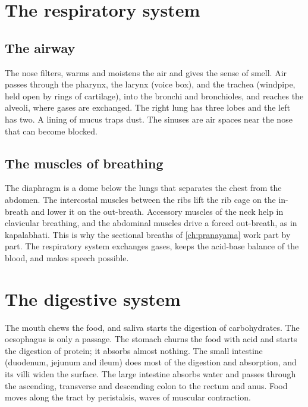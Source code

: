 
\section{The respiratory system}

\subsection*{The airway}
The nose filters, warms and moistens the air and gives the sense of smell. Air passes through the pharynx, the larynx (voice box), and the trachea (windpipe, held open by rings of cartilage), into the bronchi and bronchioles, and reaches the alveoli, where gases are exchanged. The right lung has three lobes and the left has two. A lining of mucus traps dust. The sinuses are air spaces near the nose that can become blocked.


\subsection*{The muscles of breathing}
The diaphragm is a dome below the lungs that separates the chest from the abdomen. The intercostal muscles between the ribs lift the rib cage on the in-breath and lower it on the out-breath. Accessory muscles of the neck help in clavicular breathing, and the abdominal muscles drive a forced out-breath, as in kapalabhati. This is why the sectional breaths of \cref{ch:pranayama} work part by part. The respiratory system exchanges gases, keeps the acid-base balance of the blood, and makes speech possible.


\section{The digestive system}

The mouth chews the food, and saliva starts the digestion of carbohydrates. The oesophagus is only a passage. The stomach churns the food with acid and starts the digestion of protein; it absorbs almost nothing. The small intestine (duodenum, jejunum and ileum) does most of the digestion and absorption, and its villi widen the surface. The large intestine absorbs water and passes through the ascending, transverse and descending colon to the rectum and anus. Food moves along the tract by peristalsis, waves of muscular contraction.

